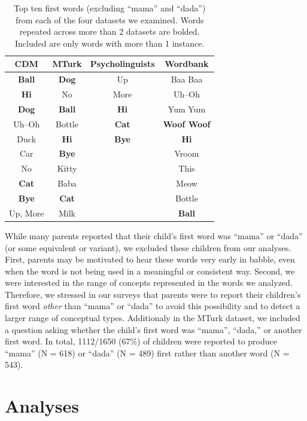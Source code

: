 \documentclass[10pt,letterpaper]{article}
\begin{document}
\begin{table}[t]
\centering
\begin{tabular}{cccc}
\hline
{\bf CDM} & {\bf MTurk} & {\bf Psycholinguists} & {\bf Wordbank} \\ 
\hline
\textbf{Ball} & \textbf{Dog} & Up & Baa Baa \\ 
\textbf{Hi} & No & More & Uh--Oh \\
\textbf{Dog} & \textbf{Ball} & \textbf{Hi} & Yum Yum \\ 
Uh--Oh & Bottle & \textbf{Cat} & \textbf{Woof Woof} \\ 
Duck & \textbf{Hi} & \textbf{Bye} & \textbf{Hi} \\
Car & \textbf{Bye} &  & Vroom \\
No & Kitty &  & This \\
\textbf{Cat} & Baba &  & Meow \\
\textbf{Bye} & \textbf{Cat} &  & Bottle \\
Up, More & Milk &  & \textbf{Ball} \\
\hline 
\end{tabular}
\caption{\label{tab:top10} Top ten first words (excluding ``mama'' and ``dada'') from each of the four datasets we examined. Words repeated across more than 2 datasets are bolded. Included are only words with more than 1 instance.}
\vspace{-2em}
\end{table}


While many parents reported that their child's first word was ``mama'' or ``dada'' (or some equivalent or variant), we excluded these children from our analyses. First, parents may be motivated to hear these words very early in babble, even when the word is not being used in a meaningful or consistent way. Second, we were interested in the range of concepts represented in the words we analyzed. Therefore, we stressed in our surveys that parents were to report their children's first word \emph{other} than ``mama'' or ``dada'' to avoid this possibility and to detect a larger range of conceptual types. Additionaly in the MTurk dataset, we included a question asking whether the child's first word was ``mama'', ``dada,'' or another first word. In total, 1112/1650 (67\%) of children were reported to produce ``mama'' (N = 618) or ``dada'' (N = 489) first rather than another word (N = 543).

\section{Analyses}
\end{document}
